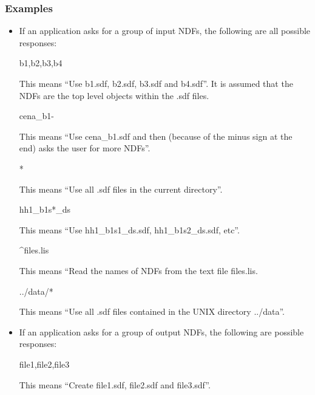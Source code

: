 \documentclass[11pt,nolof,noabs]{starlink}
\begin{document}
\subsubsection{Examples}
\begin{itemize}
\item If an application asks for a group of input {\small NDF}s, the following
are all possible responses:

\small
\begin{terminalv}
b1,b2,b3,b4
\end{terminalv}
\normalsize
\vspace{-3mm}
This means ``Use b1.sdf, b2.sdf, b3.sdf and b4.sdf''. It is  assumed that the
{\small NDF}s are the top level objects  within the .sdf files.

\small
\begin{terminalv}
cena_b1-
\end{terminalv}
\normalsize
\vspace{-3mm}
This means ``Use cena\_b1.sdf and then (because of the minus sign at the end)
asks the user for  more {\small NDF}s''.

\small
\begin{terminalv}
*
\end{terminalv}
\normalsize
\vspace{-3mm}
This means ``Use all .sdf files in the current directory''.

\small
\begin{terminalv}
hh1_b1s*_ds
\end{terminalv}
\normalsize
\vspace{-3mm}
This means ``Use hh1\_b1s1\_ds.sdf, hh1\_b1s2\_ds.sdf, etc''.

\small
\begin{terminalv}
^files.lis
\end{terminalv}
\normalsize
\vspace{-3mm}
This means ``Read the names of {\small NDF}s from the text file files.lis.

\small
\begin{terminalv}
../data/*
\end{terminalv}
\normalsize
\vspace{-3mm}
This means ``Use all .sdf files contained in the {\small UNIX} directory
../data''.

\item If an application asks for a group of output {\small NDF}s, the following
are possible responses:

\small
\begin{terminalv}
file1,file2,file3
\end{terminalv}
\normalsize
\vspace{-3mm}
This means ``Create file1.sdf, file2.sdf and file3.sdf''.


\end{itemize}
\end{document}

